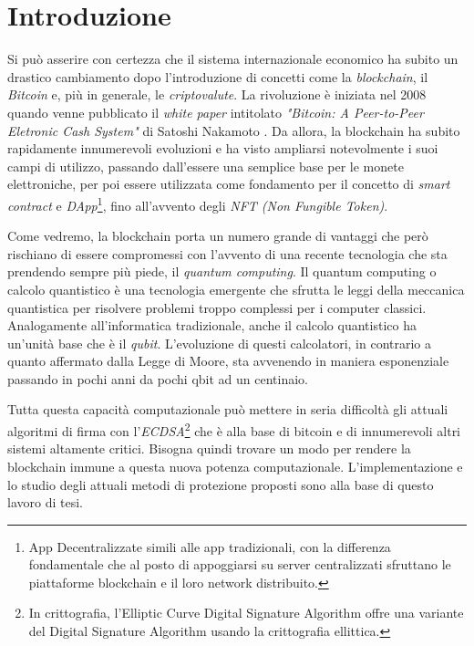 \chapter*{Introduzione}
%
Si può asserire con certezza che il sistema internazionale economico ha subito un drastico cambiamento dopo l'introduzione di concetti come la \textit{blockchain}, il \textit{Bitcoin} e, più in generale, le \textit{criptovalute}. La rivoluzione è iniziata nel 2008 quando venne pubblicato il \textit{white paper} intitolato \textit{"Bitcoin: A Peer-to-Peer Eletronic Cash System"} di Satoshi Nakamoto \cite{bitcoin-white-paper}. Da allora, la blockchain ha subito rapidamente innumerevoli evoluzioni e ha visto ampliarsi notevolmente i suoi campi di utilizzo, passando dall'essere una semplice base per le monete  elettroniche, per poi essere utilizzata come fondamento per il concetto di  \textit{smart contract} e \textit{DApp}\footnote{App Decentralizzate simili alle app tradizionali, con la differenza fondamentale che al posto di appoggiarsi su server centralizzati sfruttano le piattaforme blockchain e il loro network distribuito.}, fino all'avvento degli \textit{NFT (Non Fungible Token)}.

Come vedremo, la blockchain porta un numero grande di vantaggi che però rischiano di essere compromessi con l'avvento di una recente tecnologia che sta prendendo sempre più piede, il \textit{quantum computing}. Il quantum computing o calcolo quantistico è una tecnologia emergente che sfrutta le leggi della meccanica quantistica per risolvere problemi troppo complessi per i computer classici. Analogamente all'informatica tradizionale, anche il calcolo quantistico ha un'unità base che è il \textit{qubit}. L'evoluzione di questi calcolatori, in contrario a quanto affermato dalla Legge di Moore, sta avvenendo in maniera esponenziale passando in pochi anni da pochi qbit ad un centinaio.

Tutta questa capacità computazionale può mettere in seria difficoltà gli attuali algoritmi di firma con l'\textit{ECDSA}\footnote{In crittografia, l'Elliptic Curve Digital Signature Algorithm offre una variante del Digital Signature Algorithm usando la crittografia ellittica.} che è alla base di bitcoin e di innumerevoli altri sistemi altamente critici. Bisogna quindi trovare un modo per rendere la blockchain immune a questa nuova potenza computazionale. L'implementazione e lo studio degli attuali metodi di protezione proposti sono alla base di questo lavoro di tesi.

